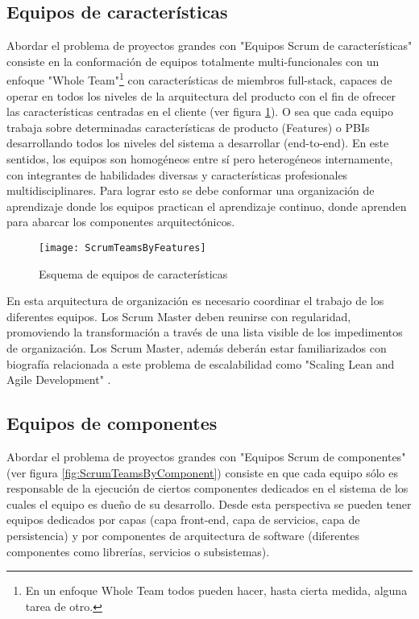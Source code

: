 \subsection{Equipos de características}

Abordar el problema de proyectos grandes con "Equipos Scrum de características" consiste en la conformación de equipos totalmente multi-funcionales con un enfoque "Whole Team"\footnote{En un enfoque Whole Team todos pueden hacer, hasta cierta medida, alguna tarea de otro\cite{Juan-Gabardini-2015}.} con características de miembros full-stack, capaces de operar en todos los niveles de la arquitectura del producto con el fin de ofrecer las características centradas en el cliente (ver figura \ref{fig:ScrumTeamsByFeatures}). O sea que cada equipo trabaja sobre determinadas características de producto (Features) o PBIs desarrollando todos los niveles del sistema a desarrollar (end-to-end). En este sentidos, los equipos son homogéneos entre sí pero heterogéneos internamente, con integrantes de habilidades diversas y características profesionales multidisciplinares. Para lograr esto se debe conformar una organización de aprendizaje donde los equipos practican el aprendizaje continuo, donde aprenden para abarcar los componentes arquitectónicos.

\begin{figure}[h]
  \centering
  \texttt{[image: ScrumTeamsByFeatures]}
  \caption{Esquema de equipos de características}
  \centering
  \label{fig:ScrumTeamsByFeatures} %
\end{figure}

En esta arquitectura de organización es necesario coordinar el trabajo de los diferentes equipos. Los Scrum Master deben reunirse con regularidad, promoviendo la transformación a través de una lista visible de los impedimentos de organización. Los Scrum Master, además deberán estar familiarizados con biografía relacionada a este problema de escalabilidad como "Scaling Lean and Agile Development" \cite{Larman-Vodde-2008}.

\subsection{Equipos de componentes}

Abordar el problema de proyectos grandes con "Equipos Scrum de componentes" (ver figura \ref{fig:ScrumTeamsByComponent}) consiste en que cada equipo sólo es responsable de la ejecución de ciertos componentes dedicados en el sistema de los cuales el equipo es dueño de su desarrollo. Desde esta perspectiva se pueden tener equipos dedicados por capas (capa front-end, capa de servicios, capa de persistencia) y por componentes de arquitectura de software (diferentes componentes como librerías, servicios o subsistemas).

